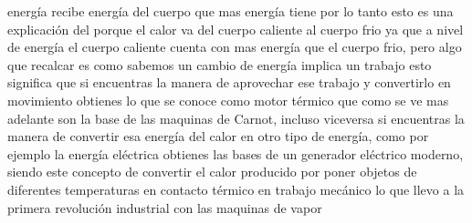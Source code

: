 \documentclass{article}
\begin{document}
energía recibe energía del cuerpo que mas energía tiene por lo tanto esto es una explicación del porque el calor va del cuerpo caliente al cuerpo frio ya que 
a nivel de energía el cuerpo caliente cuenta con mas energía que el cuerpo frio, pero algo que recalcar es como sabemos un cambio de energía implica un trabajo
esto significa que si encuentras la manera de aprovechar ese trabajo y convertirlo en movimiento obtienes lo que se conoce como motor térmico que como se ve mas
adelante son la base de las maquinas de Carnot, incluso viceversa si encuentras la manera de convertir esa energía del calor en otro tipo de energía, como por ejemplo
la energía eléctrica obtienes las bases de un generador eléctrico moderno, siendo este concepto de convertir el calor producido por poner objetos de diferentes 
temperaturas en contacto térmico en trabajo mecánico lo que llevo a la primera revolución industrial con las maquinas de vapor 
\end{document}
